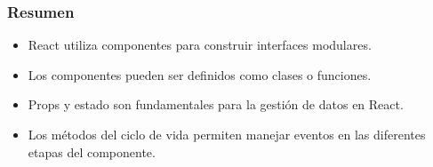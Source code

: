 \documentclass[10pt]{beamer}
\begin{document}
\begin{frame}
  \frametitle{Resumen}
  \begin{itemize}
    \item React utiliza componentes para construir interfaces modulares.
    \item Los componentes pueden ser definidos como clases o funciones.
    \item Props y estado son fundamentales para la gestión de datos en React.
    \item Los métodos del ciclo de vida permiten manejar eventos en las diferentes etapas del componente.
  \end{itemize}
\end{frame}
\end{document}
